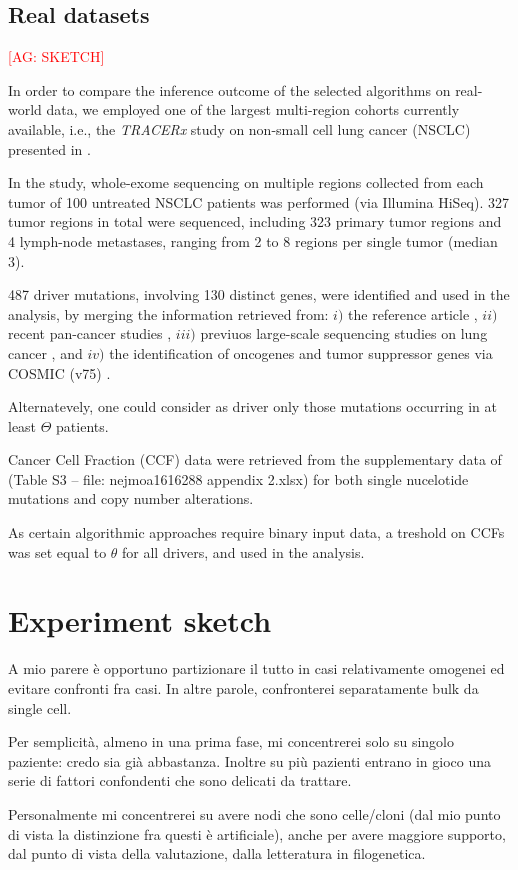 \documentclass{article}
\begin{document}
\subsection{Real datasets}
\textcolor{red}{[AG: SKETCH]}

In order to compare the inference outcome of the selected algorithms on real-world data, we employed one of the largest multi-region cohorts currently available, i.e., the \emph{TRACERx} study on non-small cell lung cancer (NSCLC) presented in \cite{jamal2017tracking}. 

In the study, whole-exome sequencing on multiple regions collected from each tumor of 100 untreated NSCLC patients was performed (via Illumina HiSeq). 
327 tumor regions in total were sequenced, including 323 primary tumor regions and 4 lymph-node metastases, ranging from 2 to 8 regions per single tumor (median 3).

487  driver mutations, involving 130 distinct genes, were identified and used in the analysis, by merging the information retrieved from: $i)$ the reference article \cite{jamal2017tracking}, $ii)$ recent pan-cancer studies \cite{lawrence2014discovery}, $iii)$ previuos large-scale sequencing studies on lung cancer \cite{cancer2012comprehensive,cancer2014comprehensive}, and $iv)$ the identification of oncogenes and tumor suppressor genes  via COSMIC (v75) \cite{forbes2016cosmic}.

Alternatevely, one could consider as driver only those mutations occurring in at least $\Theta$ patients. 

Cancer Cell Fraction (CCF) data were retrieved from the supplementary data of \cite{jamal2017tracking} (Table S3 -- file: nejmoa1616288 appendix 2.xlsx) for both single nucelotide mutations and copy number alterations.

As certain algorithmic approaches require binary input data, a treshold on CCFs was set equal to $\theta$ for all drivers, and used in the analysis. 


\section{Experiment sketch}

A mio parere è opportuno partizionare il tutto in casi relativamente
omogenei ed evitare confronti fra casi. In altre parole, confronterei
separatamente bulk da single cell.

Per semplicità, almeno in una prima fase, mi concentrerei solo su
singolo paziente: credo sia già abbastanza. Inoltre su più pazienti
entrano in gioco una serie di fattori confondenti che sono delicati da
trattare.

Personalmente mi concentrerei su avere nodi che sono celle/cloni (dal
mio punto di vista la distinzione fra questi è artificiale), anche per
avere maggiore supporto, dal punto di vista della valutazione, dalla
letteratura in filogenetica.


\end{document}
